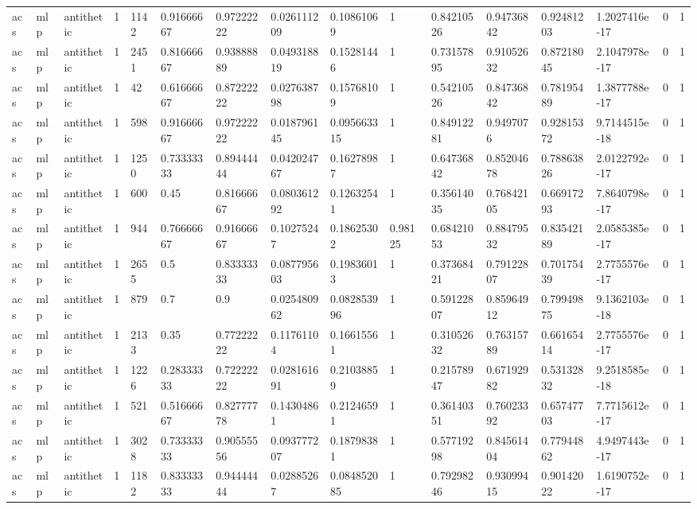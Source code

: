 \begin{tabular}{llllllllllllllll}
acs & mlp & antithetic & 1 & 1142 & 0.91666667 & 0.97222222 & 0.026111209 & 0.10861069 & 1 & 0.84210526 & 0.94736842 & 0.92481203 & 1.2027416e-17 & 0 & 1 \\
acs & mlp & antithetic & 1 & 2451 & 0.81666667 & 0.93888889 & 0.049318819 & 0.15281446 & 1 & 0.73157895 & 0.91052632 & 0.87218045 & 2.1047978e-17 & 0 & 1 \\
acs & mlp & antithetic & 1 & 42 & 0.61666667 & 0.87222222 & 0.027638798 & 0.15768109 & 1 & 0.54210526 & 0.84736842 & 0.78195489 & 1.3877788e-17 & 0 & 1 \\
acs & mlp & antithetic & 1 & 598 & 0.91666667 & 0.97222222 & 0.018796145 & 0.095663315 & 1 & 0.84912281 & 0.9497076 & 0.92815372 & 9.7144515e-18 & 0 & 1 \\
acs & mlp & antithetic & 1 & 1250 & 0.73333333 & 0.89444444 & 0.042024767 & 0.16278987 & 1 & 0.64736842 & 0.85204678 & 0.78863826 & 2.0122792e-17 & 0 & 1 \\
acs & mlp & antithetic & 1 & 600 & 0.45 & 0.81666667 & 0.080361292 & 0.12632541 & 1 & 0.35614035 & 0.76842105 & 0.66917293 & 7.8640798e-17 & 0 & 1 \\
acs & mlp & antithetic & 1 & 944 & 0.76666667 & 0.91666667 & 0.10275247 & 0.18625302 & 0.98125 & 0.68421053 & 0.88479532 & 0.83542189 & 2.0585385e-17 & 0 & 1 \\
acs & mlp & antithetic & 1 & 2655 & 0.5 & 0.83333333 & 0.087795603 & 0.19836013 & 1 & 0.37368421 & 0.79122807 & 0.70175439 & 2.7755576e-17 & 0 & 1 \\
acs & mlp & antithetic & 1 & 879 & 0.7 & 0.9 & 0.025480962 & 0.082853996 & 1 & 0.59122807 & 0.85964912 & 0.79949875 & 9.1362103e-18 & 0 & 1 \\
acs & mlp & antithetic & 1 & 2133 & 0.35 & 0.77222222 & 0.11761104 & 0.16615561 & 1 & 0.31052632 & 0.76315789 & 0.66165414 & 2.7755576e-17 & 0 & 1 \\
acs & mlp & antithetic & 1 & 1226 & 0.28333333 & 0.72222222 & 0.028161691 & 0.21038859 & 1 & 0.21578947 & 0.67192982 & 0.53132832 & 9.2518585e-18 & 0 & 1 \\
acs & mlp & antithetic & 1 & 521 & 0.51666667 & 0.82777778 & 0.14304861 & 0.21246591 & 1 & 0.36140351 & 0.76023392 & 0.65747703 & 7.7715612e-17 & 0 & 1 \\
acs & mlp & antithetic & 1 & 3028 & 0.73333333 & 0.90555556 & 0.093777207 & 0.18798381 & 1 & 0.57719298 & 0.84561404 & 0.77944862 & 4.9497443e-17 & 0 & 1 \\
acs & mlp & antithetic & 1 & 1182 & 0.83333333 & 0.94444444 & 0.02885267 & 0.084852085 & 1 & 0.79298246 & 0.93099415 & 0.90142022 & 1.6190752e-17 & 0 & 1 \\

\end{tabular}
